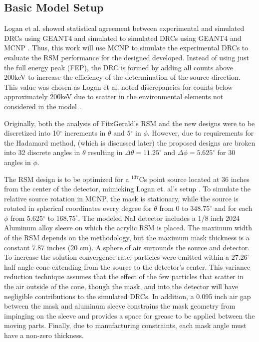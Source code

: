 \documentclass[3p,times]{elsarticle}
\begin{document}
\subsection{Basic Model Setup}
Logan et al.\cite{Logan2017} showed statistical agreement between experimental and simulated DRCs using GEANT4 \cite{Agostinelli03} and simulated to simulated DRCs using GEANT4 and MCNP \cite{Goorley13}.
Thus, this work will use MCNP to simulate the experimental DRCs to evaluate the RSM performance for the designed developed.  
Instead of using just the full energy peak (FEP), the DRC is formed by adding all counts above 200keV to increase the efficiency of the determination of the source direction.  
This value was chosen as Logan et al. noted discrepancies for counts below approximately 200keV due to scatter in the  environmental elements not considered in the model \cite{Logan2017}.

Originally, both the analysis of FitzGerald's RSM and the new designs were to be discretized into 10$^\circ$ increments in $\theta$ and 5$^\circ$ in $\phi$.  
However, due to requirements for the Hadamard method, (which is discussed later) 
the proposed designs are broken into 32 discrete angles in $\theta$ resulting in $\Delta\theta=11.25^\circ$ and $\Delta\phi=5.625^\circ$ for 30 angles in $\phi$.

The RSM design is to be optimized for a $^{137}$Cs point source located at 36 inches from the center of the detector, mimicking Logan et. al's setup \cite{Logan2017}.  
To simulate the relative source rotation in MCNP, the mask is stationary, while the source is rotated in spherical coordinates every degree for $\theta$ from 0 to $348.75^\circ$ and for each $\phi$ from 5.625$^\circ$ to $168.75^\circ$.  
The modeled NaI detector includes a 1/8 inch 2024 Aluminum alloy sleeve on which the acrylic RSM is placed. 
The maximum width of the RSM depends on the methodology, but the maximum mask thickness is a constant 7.87 inches (20 cm).  
A sphere of air surrounds the source and detector.  
To increase the solution convergence rate, particles were emitted within a $27.26^\circ$ half angle cone extending from the source to the detector's center.  
This variance reduction technique assumes that the effect of the few particles that 
scatter in the air outside of the cone, though the mask, and into the detector will have negligible contributions to the simulated DRCs.   
In addition, a 0.095 inch air gap between the mask and aluminum sleeve constrains the mask geometry from impinging on the sleeve and provides a space for grease to be applied between the moving parts.
Finally, due to manufacturing constraints, each mask angle must have a non-zero thickness.
\end{document}

